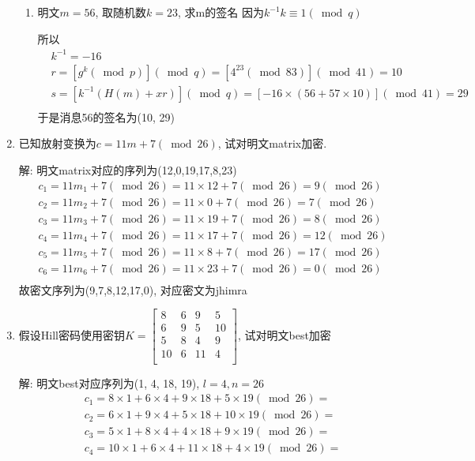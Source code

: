 \documentclass[UTF8]{ctexart}
\begin{document}
\begin{enumerate}
\begin{enumerate}
        \item 明文$m=56$, 取随机数$k=23$, 求m的签名
        因为$k^{-1}k\equiv 1(\bmod q)$

        所以
        $$
        \begin{aligned}
          &k^{-1}=-16\\
          &r=[g^k(\bmod p)](\bmod q)=[4^{23}(\bmod 83)](\bmod 41)=10\\
          &s=[k^{-1}(H(m)+xr)](\bmod q)=[-16\times(56+57\times 10)](\bmod 41)=29\\
        \end{aligned}
        $$
        于是消息56的签名为(10, 29)
      \end{enumerate}

      \item 已知放射变换为$c=11m+7(\bmod 26)$, 试对明文matrix加密.

      解: 明文matrix对应的序列为(12,0,19,17,8,23)
      $$
      \begin{aligned}
        &c_1=11m_1+7(\bmod 26)=11\times 12+7(\bmod 26)=9(\bmod 26)\\
        &c_2=11m_2+7(\bmod 26)=11\times 0+7(\bmod 26)=7(\bmod 26)\\
        &c_3=11m_3+7(\bmod 26)=11\times 19+7(\bmod 26)=8(\bmod 26)\\
        &c_4=11m_4+7(\bmod 26)=11\times 17+7(\bmod 26)=12(\bmod 26)\\
        &c_5=11m_5+7(\bmod 26)=11\times 8+7(\bmod 26)=17(\bmod 26)\\
        &c_6=11m_6+7(\bmod 26)=11\times 23+7(\bmod 26)=0(\bmod 26)\\
      \end{aligned}
      $$
      故密文序列为(9,7,8,12,17,0), 对应密文为jhimra

      \item 假设Hill密码使用密钥$K=\left[
        \begin{matrix}
          8 &6 &9 &5\\
          6 &9 &5 &10\\
          5 &8 &4 &9\\
          10 &6 &11 &4\\
        \end{matrix}
        \right]$, 试对明文best加密

        解: 明文best对应序列为(1, 4, 18, 19), $l=4, n=26$
        $$
        \begin{aligned}
          &c_1=8\times 1+6\times 4+9\times 18+5\times 19(\bmod 26)=\\
          &c_2=6\times 1+9\times 4+5\times 18+10\times 19(\bmod 26)=\\
          &c_3=5\times 1+8\times 4+4\times 18+9\times 19(\bmod 26)=\\
          &c_4=10\times 1+6\times 4+11\times 18+4\times 19(\bmod 26)=\\
        \end{aligned}
        $$


\end{enumerate}
\end{document}
